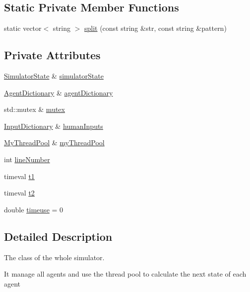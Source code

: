 \subsection*{Static Private Member Functions}
\begin{DoxyCompactItemize}
\item 
static vector$<$ string $>$ \hyperlink{classSimulator_a6cd43123d84d9441152c4f416f7fe239}{split} (const string \&str, const string \&pattern)
\end{DoxyCompactItemize}
\subsection*{Private Attributes}
\begin{DoxyCompactItemize}
\item 
\hyperlink{main_8hpp_a4cb9f4bcd812094244f1949a88671bb8}{Simulator\+State} \& \hyperlink{classSimulator_adac2342fdb4ea403867b50df76a8d0c7}{simulator\+State}
\item 
\hyperlink{Server_8hpp_acc6d6e73aa06631da7c2f627f9979d64}{Agent\+Dictionary} \& \hyperlink{classSimulator_adc23128e4d69f004ce27410cb505bd2a}{agent\+Dictionary}
\item 
std\+::mutex \& \hyperlink{classSimulator_a7292c6375fc98bac2acd5b183aab36fb}{mutex}
\item 
\hyperlink{Server_8hpp_a49cc8333bde52a7f1eb36bdb3e4e8a06}{Input\+Dictionary} \& \hyperlink{classSimulator_a5d1671432b317ac4ddb63acb0267388b}{human\+Inputs}
\item 
\hyperlink{classMyThreadPool}{My\+Thread\+Pool} \& \hyperlink{classSimulator_afd96ecff25700211fcd29f3cce0c2d18}{my\+Thread\+Pool}
\item 
int \hyperlink{classSimulator_aa765c0e8bded253061bf1ffb2ba6c672}{line\+Number}
\item 
timeval \hyperlink{classSimulator_a6de4772dbd09ae8f0b9f049efada5348}{t1}
\item 
timeval \hyperlink{classSimulator_a72a269b612e7c60a7d064718a9f33f79}{t2}
\item 
double \hyperlink{classSimulator_ad243edbcd9f9b3a4fa4b6f218444f7ae}{timeuse} = 0
\end{DoxyCompactItemize}


\subsection{Detailed Description}
The class of the whole simulator. 

It manage all agents and use the thread pool to calculate the next state of each agent 

